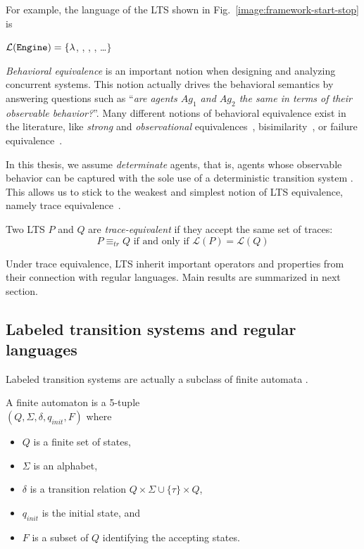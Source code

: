 For example, the language of the LTS shown in Fig.~\ref{image:framework-start-stop} is
\begin{center}
$\mathcal{L}(\texttt{Engine})=\{\lambda$, , , , \ldots $\}$
\end{center} 

\emph{Behavioral equivalence} is an important notion when designing and analyzing concurrent systems. This notion actually drives the behavioral semantics by answering questions such as ``\emph{are agents $Ag_1$ and $Ag_2$ the same in terms of their observable behavior?}''. Many different notions of behavioral equivalence exist in the literature, like \emph{strong} and \emph{observational} equivalences~\cite{Milner:1989}, bisimilarity~\cite{Park:1981}, or failure equivalence~\cite{Hoare:1985}. 

In this thesis, we assume \emph{determinate} agents, that is, agents whose observable behavior can be captured with the sole use of a deterministic transition system \cite{Engelfriet:1985}. This allows us to stick to the weakest and simplest notion of LTS equivalence, namely trace equivalence~\cite{Hoare:1985, Engelfriet:1985}. 

\begin{definition}
Two LTS $P$ and $Q$ are \emph{trace-equivalent} if they accept the same set of traces:
\begin{equation*}
P \equiv_{tr} Q \mbox{~if and only if~} \mathcal{L}(P) = \mathcal{L}(Q)
\end{equation*}
\label{definition:trace-equivalence}
\end{definition}

Under trace equivalence, LTS inherit important operators and properties from their connection with regular languages. Main results are summarized in next section.

\subsection{Labeled transition systems and regular languages\label{section:background-lts-and-regular-languages}}

Labeled transition systems are actually a subclass of finite automata \cite{Hopcroft:1979}. 

\begin{definition}
A finite automaton is a 5-tuple \\ $(Q,\Sigma,\delta,q_{init},F)$ where 
\begin{itemize}
\item $Q$ is a finite set of states, 
\item $\Sigma$ is an alphabet, 
\item $\delta$ is a transition relation $Q \times \Sigma\cup\{\tau\} \times Q$, 
\item $q_{init}$ is the initial state, and 
\item $F$ is a subset of $Q$ identifying the accepting states. 
\end{itemize}
\end{definition}

